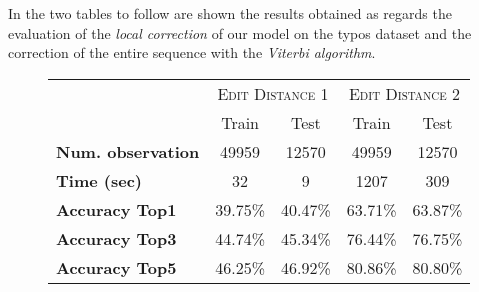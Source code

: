 In the two tables to follow are shown the results obtained as regards the evaluation of the \textit{local correction} of our 
model on the typos dataset and the correction of the entire sequence with the \textit{Viterbi algorithm}.

\begin{figure}[H]
	\centering
	\begin{tabular}{lcc|cc}
		\toprule
		&\multicolumn{2}{c|}{\textsc{Edit Distance 1}} & \multicolumn{2}{c}{\textsc{Edit Distance 2}}\\
		& Train & Test & Train & Test \\
		\midrule
		\textbf{Num. observation} & \num{49959} & \num{12570} & \num{49959} & \num{12570} \\
		\textbf{Time (sec)}  		& \num{32} 				& \num{9} 			& \num{1207} 	& \num{309} \\
		\textbf{Accuracy Top1} & \num{39,75}\%  & \num{40,47}\%  & \num{63,71}\%  & \num{63,87}\%  \\
		\textbf{Accuracy Top3} &  \num{44,74}\%  & \num{45,34}\%  & \num{76,44}\%  & \num{76,75}\%  \\
		\textbf{Accuracy Top5} & \num{46,25}\%  & \num{46,92}\%  & \num{80,86}\%  & \num{80,80}\%  \\
		\bottomrule
	\end{tabular}
	\label{tab:typo-eval3}
\end{figure}

